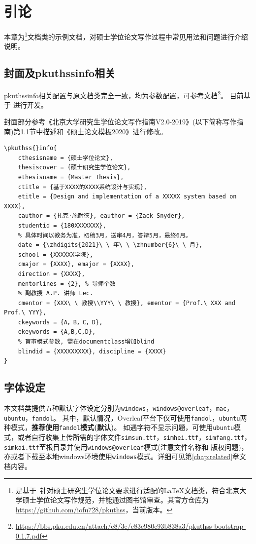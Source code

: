 \chapter{引论}
\label{chap:introduction}

本章为\iofupkuthss{}\footnote{\iofupkuthss{} 是基于\pkuthss{}~\cite{casper2011pkuthss}针对硕士研究生学位论文要求进行适配的\LaTeX{}文档类，符合北京大学硕士学位论文写作规范，并能通过图书馆审查。其官方仓库为\url{https://github.com/iofu728/pkuthss}，当前版本\iofuversion。}文档类的示例文档，对硕士学位论文写作过程中常见用法和问题进行介绍说明。

\section{封面及pkuthssinfo相关}
\label{sec:cover-pkuthssinfo}

pkuthssinfo相关配置与\pkuthss{}原文档类完全一致，均为参数配置，可参考\pkuthss{}文档\footnote{\url{https://bbs.pku.edu.cn/attach/c8/3e/c83e980c93b838a3/pkuthss-bootstrap-0.1.7.pdf}}。
目前\iofupkuthss{}基于\pkuthss{} \iofubaseversion{}进行开发。

封面部分参考《北京大学研究生学位论文写作指南V2.0-2019》(以下简称写作指南)第1.1节中描述和《硕士论文模板2020》进行修改。

\begin{Verbatim}
\pkuthss{}info{
	cthesisname = {硕士学位论文},
 	thesiscover = {硕士研究生学位论文},
	ethesisname = {Master Thesis},
	ctitle = {基于XXXX的XXXX系统设计与实现},
	etitle = {Design and implementation of a XXXXX system based on XXXX},
	cauthor = {扎克·施耐德}, eauthor = {Zack Snyder},
	studentid = {180XXXXXXX},
	% 具体时间以教务为准，初稿3月，送审4月，答辩5月，最终6月。
	date = {\zhdigits{2021}\ \ 年\ \ \zhnumber{6}\ \ 月},
	school = {XXXXXX学院},
	cmajor = {XXXX}, emajor = {XXXX},
	direction = {XXXX},
	mentorlines = {2}, % 导师个数
	% 副教授 A.P. 讲师 Lec.
	cmentor = {XXX\ \ 教授\\YYY\ \ 教授}, ementor = {Prof.\ XXX and Prof.\ YYY},
	ckeywords = {A，B，C，D},
	ekeywords = {A,B,C,D},
	% 盲审模式参数, 需在documentclass增加blind
	blindid = {XXXXXXXXX}, discipline = {XXXX}
}
\end{Verbatim}

\section{字体设定}
\label{sec:fontset}

本文档类提供五种默认字体设定分别为\verb|windows|，\verb|windows@overleaf|，\verb|mac|，\verb|ubuntu|，\verb|fandol|。
其中，默认情况，Overleaf平台下仅可使用\verb|fandol|，\verb|ubuntu|两种模式，\textbf{推荐使用}\verb|fandol|\textbf{模式(默认)}。
如遇字符不显示问题，可使用\verb|ubuntu|模式，或者自行收集上传所需的字体文件\verb|simsun.ttf|，\verb|simhei.ttf|，\verb|simfang.ttf|，\verb|simkai.ttf|至根目录并使用\verb|windows@overleaf|模式(注意文件名称和 版权问题)，亦或者下载至本地windows环境使用\verb|windows|模式。详细可见第\ref{chap:related}章文档内容。

